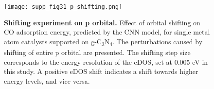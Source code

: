 \begin{figure}[htbp]
  \centering
  \texttt{[image: supp\_fig31\_p\_shifting.png]}
  \caption{\textbf{Shifting experiment on p orbital.}
  Effect of orbital shifting on CO adsorption energy, predicted by the CNN model,
  for single metal atom catalysts supported on g-C\textsubscript{3}N\textsubscript{4}.
  The perturbations caused by shifting of entire p orbital are presented.
  The shifting step size corresponds to the energy resolution of the eDOS, set at 0.005 eV in this study.
  A positive eDOS shift indicates a shift towards higher energy levels, and vice versa.}
  \label{supp_fig31:p_shifting}
\end{figure}
